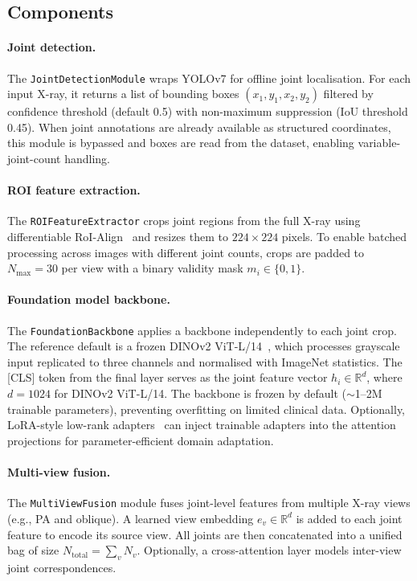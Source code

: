 \documentclass{article}
\begin{document}
\subsection{Components}

\paragraph{Joint detection.} The \texttt{JointDetectionModule} wraps YOLOv7 for offline joint localisation. For each input X-ray, it returns a list of bounding boxes $(x_1,y_1,x_2,y_2)$ filtered by confidence threshold (default 0.5) with non-maximum suppression (IoU threshold 0.45). When joint annotations are already available as structured coordinates, this module is bypassed and boxes are read from the dataset, enabling variable-joint-count handling.

\paragraph{ROI feature extraction.} The \texttt{ROIFeatureExtractor} crops joint regions from the full X-ray using differentiable RoI-Align~\cite{tvroi} and resizes them to $224\times224$ pixels. To enable batched processing across images with different joint counts, crops are padded to $N_{\max}=30$ per view with a binary validity mask $m_i \in \{0,1\}$.

\paragraph{Foundation model backbone.} The \texttt{FoundationBackbone} applies a backbone independently to each joint crop. The reference default is a frozen DINOv2 ViT-L/14~\cite{dinov22023}, which processes grayscale input replicated to three channels and normalised with ImageNet statistics. The [CLS] token from the final layer serves as the joint feature vector $h_i \in \mathbb{R}^{d}$, where $d=1024$ for DINOv2 ViT-L/14. The backbone is frozen by default ($\sim$1--2M trainable parameters), preventing overfitting on limited clinical data. Optionally, LoRA-style low-rank adapters~\cite{lora2021} can inject trainable adapters into the attention projections for parameter-efficient domain adaptation.

\paragraph{Multi-view fusion.} The \texttt{MultiViewFusion} module fuses joint-level features from multiple X-ray views (e.g., PA and oblique). A learned view embedding $e_v \in \mathbb{R}^d$ is added to each joint feature to encode its source view. All joints are then concatenated into a unified bag of size $N_{\text{total}} = \sum_v N_v$. Optionally, a cross-attention layer models inter-view joint correspondences.
\end{document}

